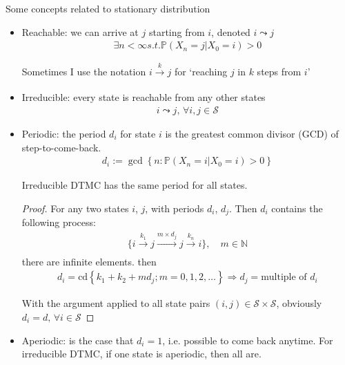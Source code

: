         Some concepts related to stationary distribution
    \begin{itemize}[topsep=2pt,itemsep=0pt]
        \item Reachable: we can arrive at $ j $ starting from $ i $, denoted $ i\leadsto j $
        \begin{align}
            \exists n<\infty s.t. \mathbb{P}\left( X_n=j|X_0=i \right) > 0 
        \end{align}

        Sometimes I use the notation $ i\xrightarrow[]{k}j  $ for `reaching $ j $ in $ k $ steps from $ i $'
        \item Irreducible: every state is reachable from any other states
        \begin{align}
            i\leadsto j,\,\forall i,j\in\mathcal{S} 
        \end{align}
        
        \item Periodic: the period $ d_i $ for state $ i $ is the greatest common divisor (GCD) of step-to-come-back.
        \begin{align}
            d_i:=\gcd\left\{ n:\mathbb{P}\left( X_n=i|X_0=i \right)>0  \right\} 
        \end{align}

        Irreducible DTMC has the same period for all states.

        \begin{proof}
            For any two states $ i $, $ j $, with periods $ d_i $, $ d_j $. Then $ d_i $ contains the following process:
            \begin{align}
                \{i\xrightarrow[]{k_1}j\xrightarrow[]{m\times d_j}j\xrightarrow[]{k_n}i \} ,\quad m\in\mathbb{N}
            \end{align}
            there are infinite elements. then
            \begin{align}
                d_i=\mathrm{cd} \left\{ k_1+k_2+md_j;m=0,1,2,\ldots \right\} \Rightarrow d_j=\text{multiple of }d_i
            \end{align}
         
            With the argument applied to all state pairs $ (i,j)\in\mathcal{S}\times \mathcal{S} $, obviously $ d_i=d,\,\forall i\in\mathcal{S} $
        \end{proof}
        \item Aperiodic: is the case that $ d_i=1 $, i.e. possible to come back anytime. For irreducible DTMC, if one state is aperiodic, then all are.        
        

\end{itemize}
